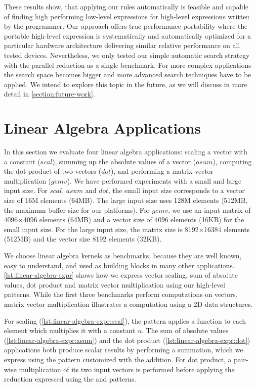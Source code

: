 \bigskip

\noindent
These results show, that applying our rules automatically is feasible and capable of finding high performing low-level expressions for high-level expressions written by the programmer.
Our approach offers true performance portability where the portable high-level expression is systematically and automatically optimized for a particular hardware architecture delivering similar relative performance on all tested devices.
Nevertheless, we only tested our simple automatic search strategy with the parallel reduction as a single benchmark.
For more complex applications the search space becomes bigger and more advanced search techniques have to be applied.
We intend to explore this topic in the future, as we will discuss in more detail in \autoref{section:future-work}.




\section{Linear Algebra Applications}

In this section we evaluate four linear algebra applications: scaling a vector with a constant ($scal$), summing up the absolute values of a vector ($asum$), computing the dot product of two vectors ($dot$), and performing a matrix vector multiplication ($gemv$).
We have performed experiments with a small and large input size.
For $scal$, $asum$ and $dot$, the small input size corresponds to a vector size of 16M elements (64MB).
The large input size uses 128M elements (512MB, the maximum \OpenCL buffer size for our platforms).
For $gemv$, we use an input matrix of 4096$\times$4096 elements (64MB) and a vector size of 4096 elements (16KB) for the small input size.
For the large input size, the matrix size is 8192$\times$16384 elements (512MB) and the vector size 8192 elements (32KB).

We choose linear algebra kernels as benchmarks, because they are well known, easy to understand, and used as building blocks in many other applications.
\autoref{lst:linear-algebra-expr} shows how we express vector scaling, sum of absolute values, dot product and matrix vector multiplication using our high-level patterns.
While the first three benchmarks perform computations on vectors, matrix vector multiplication illustrates a computation using a 2D data structures.

For scaling (\autoref{lst:linear-algebra-expr:scal}), the \map pattern applies a function to each element which multiplies it with a constant $\alpha$.
The sum of absolute values (\autoref{lst:linear-algebra-expr:asum}) and the dot product (\autoref{lst:linear-algebra-expr:dot}) applications both produce scalar results by performing a summation, which we express using the \reduce pattern customized with the addition.
For dot product, a pair-wise multiplication of its two input vectors is performed before applying the reduction expressed using the \zip and \map patterns.


